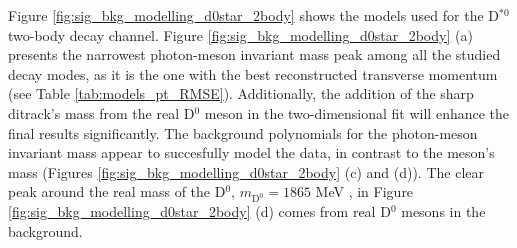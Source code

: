 Figure \ref{fig:sig_bkg_modelling_d0star_2body} shows the models used for the D$^{*0}$ two-body decay channel. Figure \ref{fig:sig_bkg_modelling_d0star_2body} (a) presents the narrowest photon-meson invariant mass peak among all the studied decay modes, as it is the one with the best reconstructed transverse momentum (see Table \ref{tab:models_pt_RMSE}). Additionally, the addition of the sharp ditrack's mass from the real D$^{0}$ meson in the two-dimensional fit will enhance the final results significantly. The background polynomials for the photon-meson invariant mass appear to succesfully model the data, in contrast to the meson's mass (Figures \ref{fig:sig_bkg_modelling_d0star_2body} (c) and (d)). The clear peak around the real mass of the D$^{0}$, $m_{\text{D}^{0}} = 1865$ MeV \cite{PDG}, in Figure \ref{fig:sig_bkg_modelling_d0star_2body} (d) comes from real D$^{0}$ mesons in the background.
